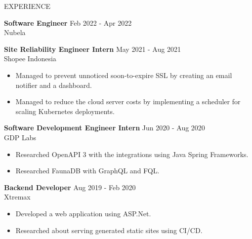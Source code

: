 \documentclass{resume} %
\begin{document}
\begin{rSection}{EXPERIENCE}

\textbf{Software Engineer} \hfill Feb 2022 - Apr 2022\\
Nubela

\textbf{Site Reliability Engineer Intern} \hfill May 2021 - Aug 2021\\
Shopee Indonesia
\begin{itemize}
  \itemsep -3pt {}
  \item Managed to prevent unnoticed soon-to-expire SSL by creating an email notifier and a dashboard.
  \item Managed to reduce the cloud server costs by implementing a scheduler for scaling Kubernetes deployments.
\end{itemize}



\textbf{Software Development Engineer Intern} \hfill Jun 2020 - Aug 2020\\
GDP Labs
\begin{itemize}
  \itemsep -3pt {}
  \item Researched OpenAPI 3 with the integrations using Java Spring Frameworks.
  \item Researched FaunaDB with GraphQL and FQL.
\end{itemize}

\textbf{Backend Developer} \hfill Aug 2019 - Feb 2020\\
Xtremax
\begin{itemize}
  \itemsep -3pt {}
  \item Developed a web application using ASP.Net.
  \item Researched about serving generated static sites using CI/CD.
\end{itemize}

\end{rSection}
\end{document}
